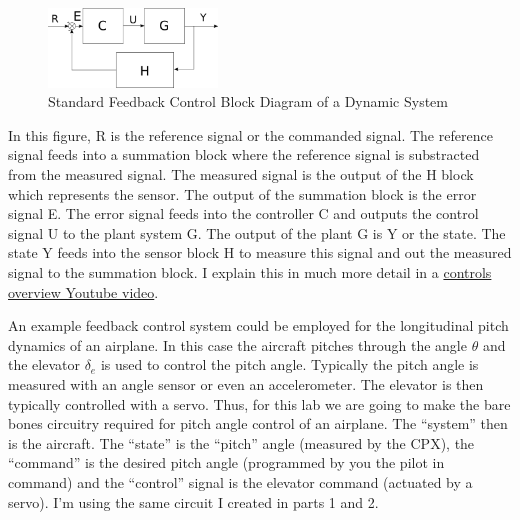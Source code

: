 \begin{figure}[H]\label{f:feedback}
  \begin{center}
    \includegraphics[width=0.4\textwidth]{Figures/feedback.png}
  \end{center}
  \caption{Standard Feedback Control Block Diagram of a Dynamic System}
\end{figure}
In this figure, R is the reference signal or the commanded signal. The reference signal feeds into a summation block where the reference signal is substracted from the measured signal. The measured signal is the output of the H block which represents the sensor. The output of the summation block is the error signal E. The error signal feeds into the controller C and outputs the control signal U to the plant system G. The output of the plant G is Y or the state. The state Y feeds into the sensor block H to measure this signal and out the measured signal to the summation block. I explain this in much more detail in a
\href{https://www.youtube.com/watch?v=PAK5V8wzVXY&list=PL_D7_GvGz-v30U58EUUOdJGgO4u75DXoB&index=1}{controls
  overview Youtube video}. 

An example feedback control system could be employed for the longitudinal pitch dynamics of an airplane. In this case the aircraft pitches through the angle $\theta$ and the elevator $\delta_e$ is used to control the pitch angle. Typically the pitch angle is measured with an angle sensor or even an accelerometer. The elevator is then typically controlled with a servo. Thus, for this lab we are going to make the bare
bones circuitry required for pitch angle control of an airplane. The
“system” then is the aircraft. The “state” is the “pitch” angle
(measured by the CPX), the “command” is the desired pitch angle
(programmed by you the pilot in command) and the “control” signal is
the elevator command (actuated by a servo). I’m using the same circuit
I created in parts 1 and 2.

